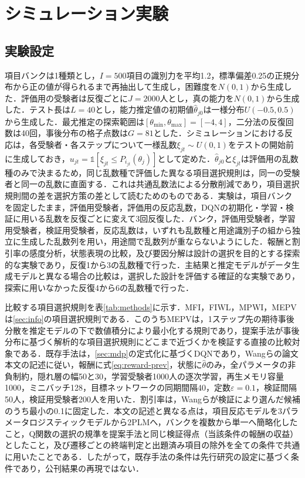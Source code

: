\documentclass[a4paper,12pt,oneside,openany]{jsbook}
\begin{document}
\chapter{シミュレーション実験}\label{sec:exp}

\section{実験設定}\label{sec:expsetting}

項目バンクは1種類とし，$I=500$項目の識別力を平均1.2，標準偏差0.25の正規分布から正の値が得られるまで再抽出して生成し，困難度を$N(0,1)$から生成した．評価用の受験者は反復ごとに$J=2000$人とし，真の能力を$N(0,1)$から生成した．テスト長は$L=40$とし，能力推定値の初期値$\hat\theta_{j0}$は一様分布$U(-0.5,0.5)$から生成した．最尤推定の探索範囲は$[\theta_{\min},\theta_{\max}]=[-4,4]$，二分法の反復回数は40回，事後分布の格子点数は$G=81$とした．シミュレーションにおける反応は，各受験者・各ステップについて一様乱数$\xi_{jt}\sim U(0,1)$をテストの開始前に生成しておき，$u_{jt}=\mathbb{1}[\xi_{jt}\le P_{i_{jt}}(\theta_j)]$として定めた．$\hat\theta_{j0}$と$\xi_{jt}$は評価用の乱数種のみで決まるため，同じ乱数種で評価した異なる項目選択規則は，同一の受験者と同一の乱数に直面する．これは共通乱数法による分散削減であり，項目選択規則間の差を選択方策の差として読むためのものである．実験は，項目バンクを固定したまま，評価用受験者，評価用の反応乱数，DQNの初期化・学習・検証に用いる乱数を反復ごとに変えて3回反復した．バンク，評価用受験者，学習用受験者，検証用受験者，反応乱数は，いずれも乱数種と用途識別子の組から独立に生成した乱数列を用い，用途間で乱数列が重ならないようにした．報酬と割引率の感度分析，状態表現の比較，及び要因分解は設計の選択を目的とする探索的な実験であり，反復1から3の乱数種で行った．主結果と推定モデルがデータ生成モデルと異なる場合の比較は，選択した設計を評価する確証的な実験であり，探索に用いなかった反復4から6の乱数種で行った．

比較する項目選択規則を表\ref{tab:methods}に示す．MFI，FIWL，MPWI，MEPVは\ref{sec:info}の項目選択規則である．このうちMEPVは，1ステップ先の期待事後分散を推定モデルの下で数値積分により最小化する規則であり，提案手法が事後分布に基づく解析的な項目選択規則にどこまで近づくかを検証する直接の比較対象である．既存手法は，\ref{sec:mdp}の定式化に基づくDQNであり，Wangらの論文本文の記述に従い，報酬に式\eqref{eq:reward-prev}，状態に$\hat\theta$のみ，全パラメータの非負制約，隠れ層の幅50と30，学習受験者1000人の逐次学習，再生メモリ容量1000，ミニバッチ128，目標ネットワークの同期間隔40，定数$\varepsilon=0.1$，検証間隔50人，検証用受験者200人を用いた．割引率は，Wangらが検証により選んだ候補のうち最小の0.1に固定した．本文の記述と異なる点は，項目反応モデルを3パラメータロジスティックモデルから2PLMへ，バンクを複数から単一へ簡略化したこと，Q関数の選択の規準を提案手法と同じ検証得点（当該条件の報酬の収益）としたこと，及び遷移ごとの終端判定と出題済み項目の除外を全ての条件で共通に用いたことである．したがって，既存手法の条件は先行研究の設定に基づく条件であり，公刊結果の再現ではない．
\end{document}
